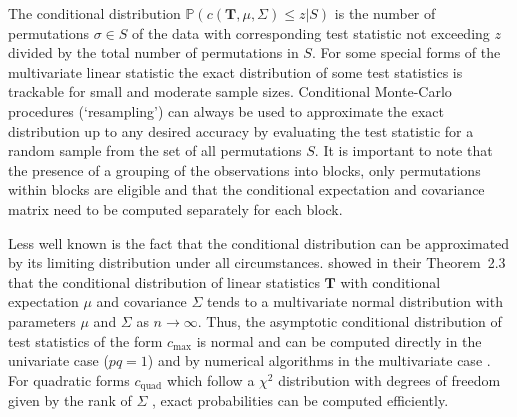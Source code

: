 \documentclass{article}
\newcommand{\Rpackage}[1]{\textit{#1}}
\newcommand{\Prob}{\mathbb{P} }
\newcommand{\T}{\mathbf{T}}
\begin{document}

The conditional distribution $\Prob(c(\T, \mu, \Sigma) \le z | S)$
is the number of permutations $\sigma \in S$ of the data 
with corresponding test statistic not exceeding $z$ divided by the total number
of permutations in $S$. For some special forms of the
multivariate linear statistic the exact distribution of some 
test statistics is trackable for small and moderate sample sizes.
Conditional Monte-Carlo procedures (`resampling') can always be used to 
approximate the exact distribution up to any desired accuracy by evaluating
the test statistic for a random sample from the set of all permutations $S$.
It is important to note that the presence of a grouping of the observations
into blocks, only permutations within blocks are eligible and that the
conditional expectation and covariance matrix need to be computed
separately for each block.

Less well known is the fact that 
the conditional distribution can be approximated by its limiting distribution
under all circumstances. \cite{StrasserWeber1999} showed in their Theorem~2.3 that the   
conditional distribution of linear statistics $\T$ with conditional    
expectation $\mu$ and covariance $\Sigma$ tends to a multivariate normal
distribution with parameters $\mu$ and $\Sigma$ as $n \rightarrow
\infty$. Thus, the asymptotic conditional distribution of test statistics of
the form $c_\text{max}$ is normal and
can be computed directly in the univariate case ($pq = 1$) and by numerical 
algorithms in the multivariate case \citep[e.g., using the quasi-randomized
Monte-Carlo procedures of][]{numerical-:1992}.
For quadratic forms
$c_\text{quad}$ which follow a $\chi^2$ distribution with degrees of freedom
given by the rank of $\Sigma$ \citep[e.g.~Theorem 6.20, ][]{Rasch1995}, exact
probabilities can be computed efficiently.
\end{document}
